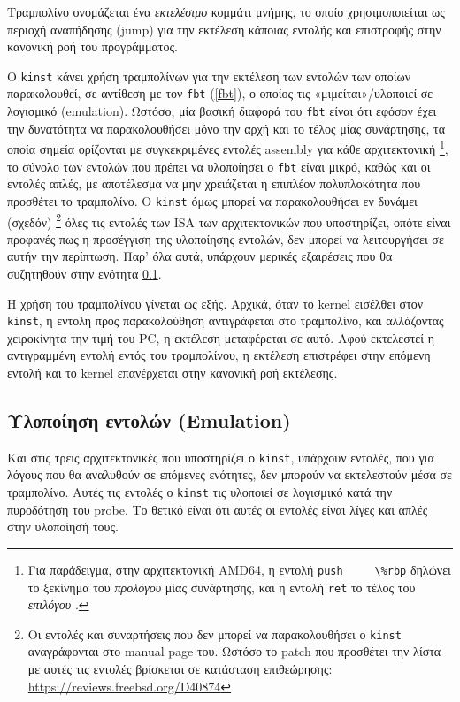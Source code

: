 \documentclass[12pt]{article}
\begin{document}
Τραμπολίνο ονομάζεται ένα \textit{εκτελέσιμο} κομμάτι μνήμης, το
οποίο χρησιμοποιείται ως περιοχή αναπήδησης (jump) για την εκτέλεση κάποιας
εντολής και επιστροφής στην κανονική ροή του προγράμματος.

Ο \lstinline{kinst} κάνει χρήση τραμπολίνων για την εκτέλεση των εντολών των
οποίων παρακολουθεί, σε αντίθεση με τον \lstinline{fbt} (\ref{fbt}), ο οποίος
τις «μιμείται»/υλοποιεί σε λογισμικό (emulation). Ωστόσο, μία βασική διαφορά
του \lstinline{fbt} είναι ότι εφόσον έχει την δυνατότητα να παρακολουθήσει μόνο
την αρχή και το τέλος μίας συνάρτησης, τα οποία σημεία ορίζονται με
συγκεκριμένες εντολές assembly για κάθε αρχιτεκτονική
\footnote{
	Για παράδειγμα, στην αρχιτεκτονική AMD64, η εντολή \lstinline{push
	\%rbp} δηλώνει το ξεκίνημα του \textit{προλόγου} μίας συνάρτησης, και η
	εντολή \lstinline{ret} το τέλος του \textit{επιλόγου}
	\cite{prologueepilogue}.
},
το σύνολο των εντολών που πρέπει να υλοποίησει ο \lstinline{fbt} είναι μικρό,
καθώς και οι εντολές απλές, με αποτέλεσμα να μην χρειάζεται η επιπλέον
πολυπλοκότητα που προσθέτει το τραμπολίνο. Ο \lstinline{kinst} όμως μπορεί να
παρακολουθήσει εν δυνάμει (σχεδόν)
\footnote{
	Οι εντολές και συναρτήσεις που δεν μπορεί να παρακολουθήσει ο
	\lstinline{kinst} αναγράφονται στο manual page του. Ωστόσο το patch που
	προσθέτει την λίστα με αυτές τις εντολές βρίσκεται σε κατάσταση
	επιθεώρησης:
	\href{https://reviews.freebsd.org/D40874}{https://reviews.freebsd.org/D40874}
}
όλες τις εντολές των ISA των αρχιτεκτονικών που υποστηρίζει, οπότε είναι
προφανές πως η προσέγγιση της υλοποίησης εντολών, δεν μπορεί να λειτουργήσει σε
αυτήν την περίπτωση. Παρ' όλα αυτά, υπάρχουν μερικές εξαιρέσεις που θα
συζητηθούν στην ενότητα \ref{emulation}.

Η χρήση του τραμπολίνου γίνεται ως εξής. Αρχικά, όταν το kernel εισέλθει στον
\lstinline{kinst}, η εντολή προς παρακολούθηση αντιγράφεται στο τραμπολίνο, και
αλλάζοντας χειροκίνητα την τιμή του PC, η εκτέλεση μεταφέρεται σε αυτό. Αφού
εκτελεστεί η αντιγραμμένη εντολή εντός του τραμπολίνου, η εκτέλεση επιστρέφει
στην επόμενη εντολή και το kernel επανέρχεται στην κανονική ροή εκτέλεσης.

\subsection{Υλοποίηση εντολών (Emulation)} \label{emulation}

Και στις τρεις αρχιτεκτονικές που υποστηρίζει ο \lstinline{kinst}, υπάρχουν
εντολές, που για λόγους που θα αναλυθούν σε επόμενες ενότητες, δεν μπορούν να
εκτελεστούν μέσα σε τραμπολίνο. Αυτές τις εντολές ο \lstinline{kinst} τις
υλοποιεί σε λογισμικό κατά την πυροδότηση του probe. Το θετικό είναι ότι αυτές
οι εντολές είναι λίγες και απλές στην υλοποίησή τους.
\end{document}
